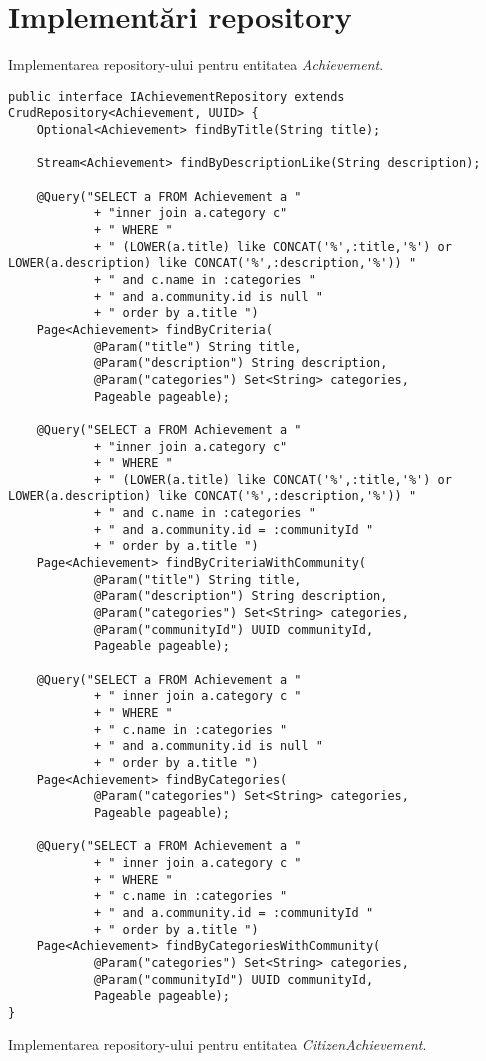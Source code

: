 \section{Implementări repository}
Implementarea repository-ului pentru entitatea \textit{Achievement}.
\begin {lstlisting}
public interface IAchievementRepository extends CrudRepository<Achievement, UUID> {
	Optional<Achievement> findByTitle(String title);

	Stream<Achievement> findByDescriptionLike(String description);
	
	@Query("SELECT a FROM Achievement a "
			+ "inner join a.category c"
			+ " WHERE " 
			+ " (LOWER(a.title) like CONCAT('%
			+ " and c.name in :categories "
			+ " and a.community.id is null "
			+ " order by a.title ")
	Page<Achievement> findByCriteria(
			@Param("title") String title, 
			@Param("description") String description,
			@Param("categories") Set<String> categories,
			Pageable pageable);
	
	@Query("SELECT a FROM Achievement a "
			+ "inner join a.category c"
			+ " WHERE " 
			+ " (LOWER(a.title) like CONCAT('%
			+ " and c.name in :categories "
			+ " and a.community.id = :communityId "
			+ " order by a.title ")
	Page<Achievement> findByCriteriaWithCommunity(
			@Param("title") String title, 
			@Param("description") String description,
			@Param("categories") Set<String> categories, 
			@Param("communityId") UUID communityId,
			Pageable pageable);
	
	@Query("SELECT a FROM Achievement a "
			+ " inner join a.category c "
			+ " WHERE " 
			+ " c.name in :categories "
			+ " and a.community.id is null " 
			+ " order by a.title ")
	Page<Achievement> findByCategories(
			@Param("categories") Set<String> categories,
			Pageable pageable);
	
	@Query("SELECT a FROM Achievement a "
			+ " inner join a.category c "
			+ " WHERE " 
			+ " c.name in :categories "
			+ " and a.community.id = :communityId " 
			+ " order by a.title ")
	Page<Achievement> findByCategoriesWithCommunity(
			@Param("categories") Set<String> categories,
			@Param("communityId") UUID communityId,
			Pageable pageable);
}
\end{lstlisting}
Implementarea repository-ului pentru entitatea \textit{CitizenAchievement}.
